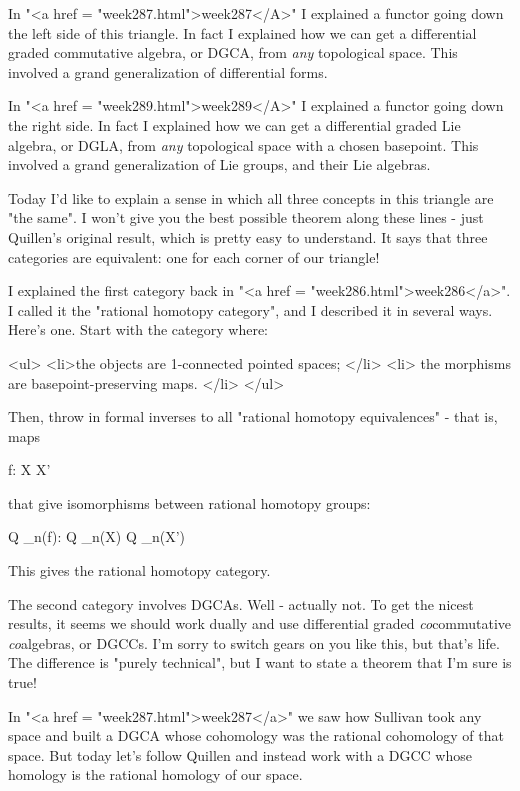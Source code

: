 In "<a href = "week287.html">week287</A>" I explained a
functor going down the left side of this triangle.  In fact I
explained how we can get a differential graded commutative algebra, or
DGCA, from \emph{any} topological space.  This involved a grand
generalization of differential forms.

In "<a href = "week289.html">week289</A>" I explained a
functor going down the right side.  In fact I explained how we can get
a differential graded Lie algebra, or DGLA, from \emph{any}
topological space with a chosen basepoint.  This involved a grand
generalization of Lie groups, and their Lie algebras.

Today I'd like to explain a sense in which all three concepts in this
triangle are "the same".  I won't give you the best possible
theorem along these lines - just Quillen's original result, which is
pretty easy to understand.  It says that three categories are
equivalent: one for each corner of our triangle!

I explained the first category back in "<a href =
"week286.html">week286</a>".  I called it the "rational
homotopy category", and I described it in several ways.  Here's
one.  Start with the category where:

<ul>
<li>the
objects are 1-connected pointed spaces;
</li>
<li>
the morphisms are basepoint-preserving maps.
</li>
</ul>

Then, throw in formal inverses to all "rational homotopy
equivalences" - that is, maps

f: X \to  X'

that give isomorphisms between rational homotopy groups:

Q \otimes  \pi _{n}(f): Q \otimes  \pi _{n}(X) 
\to  Q \otimes  \pi _{n}(X')

This gives the rational homotopy category.

The second category involves DGCAs.  Well - actually not.  To get the
nicest results, it seems we should work dually and use differential
graded \emph{co}commutative \emph{co}algebras, or DGCCs.  I'm sorry to
switch gears on you like this, but that's life.  The difference is
"purely technical", but I want to state a theorem that I'm
sure is true!

In "<a href = "week287.html">week287</a>" we saw how
Sullivan took any space and built a DGCA whose cohomology was the
rational cohomology of that space.  But today let's follow
Quillen and instead work with a DGCC whose homology is the rational
homology of our space.  


